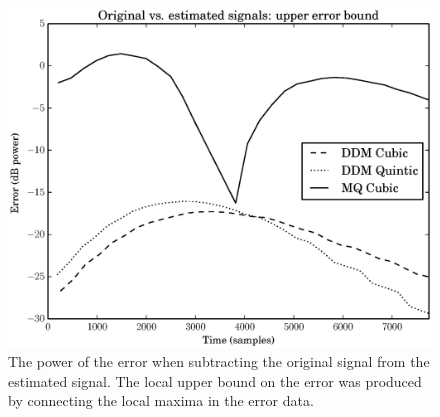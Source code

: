 \begin{figure}[!t]
    \centering
    \includegraphics[width=\figwidthscale\textwidth]{plots/mq_mod_err_comp_true_vs_est_err.eps}
    \caption{
        The power of the error when subtracting the original signal from the estimated
        signal. The local upper bound on the error was produced by connecting
        the local maxima in the error data.
    \label{plot:mqerrortruevsesterr}}
\end{figure}


